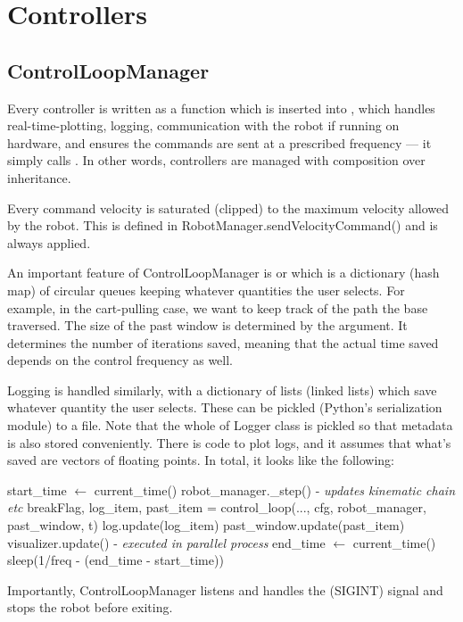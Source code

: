 \section{Controllers}
\subsection{ControlLoopManager}
Every controller is written as a function which is inserted into 
, which handles real-time-plotting,
logging, communication with the robot if running on hardware,
and ensures the commands are sent at a prescribed frequency ---
it simply calls .
In other words, controllers are managed with composition over inheritance.

Every command velocity is saturated (clipped) to the maximum velocity allowed by the robot.
This is defined in RobotManager.sendVelocityCommand() and is always applied.

An important feature of ControlLoopManager is  or
 which is a dictionary (hash map) of circular queues keeping 
whatever quantities the user selects. For example,
in the cart-pulling case, we want to keep track of the path the base traversed.
The size of the past window is determined by the 
 argument. It determines the number
of iterations saved, meaning that the actual time saved depends on the control
frequency as well.

Logging is handled similarly, with a dictionary of lists (linked lists)
which save whatever quantity the user selects.
These can be pickled (Python's serialization module) to a file.
Note that the whole of Logger class is pickled so that metadata
is also stored conveniently.
There is code to plot logs, and it assumes that what's saved are vectors of 
floating points. 
In total, it looks like the following:

\begin{algorithm}[H]
\caption{ControlLoopManager.run()}
\begin{algorithmic}[1] %
    \State start\_time $\gets$ current\_time()
    \State robot\_manager.\_step() - \textit{updates kinematic chain etc}
    \State breakFlag, log\_item, past\_item = control\_loop(..., cfg, robot\_manager, past\_window, t)
    \State log.update(log\_item)
    \State past\_window.update(past\_item)
    \State visualizer.update() - \textit{executed in parallel process}
    \State end\_time $\gets$ current\_time()
    \State sleep(1/freq - (end\_time - start\_time))
\EndWhile
\EndProcedure
\end{algorithmic}
\label{cart-reference-algorithm}
\end{algorithm}
Importantly, ControlLoopManager listens and handles the  (SIGINT) signal
and stops the robot before exiting.


